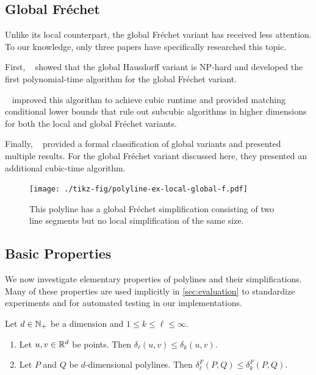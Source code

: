 \subsection{Global Fréchet}
Unlike its local counterpart, the global Fréchet variant has received less attention. To our knowledge, only three papers have specifically researched this topic.

First, \citeauthor{on_optimal_polyline_simplification_using_the_hausdorff_and_frechet_distance}~\cite{on_optimal_polyline_simplification_using_the_hausdorff_and_frechet_distance} showed that the global Hausdorff variant is NP-hard and developed the first polynomial-time algorithm for the global Fréchet variant.

\citeauthor{polyline_simplification_has_cubic_complexity_bringmannetal}~\cite{polyline_simplification_has_cubic_complexity_bringmannetal} improved this algorithm to achieve cubic runtime and provided matching conditional lower bounds that rule out subcubic algorithms in higher dimensions for both the local and global Fréchet variants.

Finally, \citeauthor{global_curve_simplification}~\cite{global_curve_simplification} provided a formal classification of global variants and presented multiple results. For the global Fréchet variant discussed here, they presented an additional cubic-time algorithm.

\begin{figure}[b]
  \centering
  \texttt{[image: ./tikz-fig/polyline-ex-local-global-f.pdf]}
  \caption{This polyline has a global Fréchet simplification consisting of two line segments but no local simplification of the same size.}
  \label{fig:polyline-ex-local-global-f}
\end{figure}

\subsection{Basic Properties}
We now investigate elementary properties of polylines and their simplifications. Many of these properties are used implicitly in \cref{sec:evaluation} to standardize experiments and for automated testing in our implementations.

\begin{lemma}\label{lem:monotonicity_minkowski}
  Let \(d \in \mathbb{N}_+\) be a dimension and \(1 \leq k \leq \ell \leq \infty\).
	\begin{enumerate}
		\item Let \(u, v \in \mathbb{R}^d\) be points. Then \(\delta_\ell(u,v) \leq \delta_k(u, v)\).
		\item Let \(P\) and \(Q\) be \(d\)-dimensional polylines. Then \(\delta_\ell^F(P, Q) \leq \delta_k^F(P, Q)\).
	\end{enumerate}
\end{lemma}

